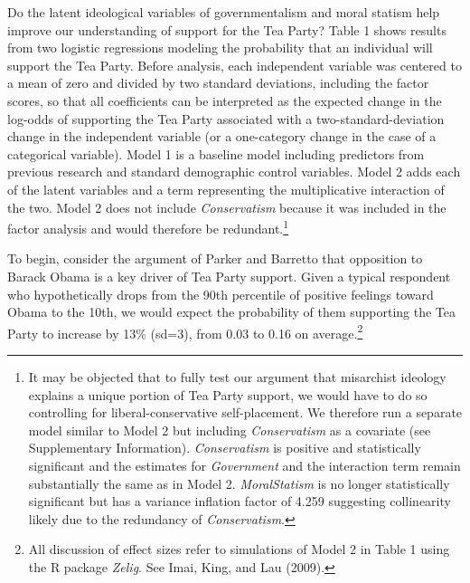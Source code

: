 \documentclass[12pt,]{article}
\begin{document}
Do the latent ideological variables of governmentalism and moral statism
help improve our understanding of support for the Tea Party? Table 1
shows results from two logistic regressions modeling the probability
that an individual will support the Tea Party. Before analysis, each
independent variable was centered to a mean of zero and divided by two
standard deviations, including the factor scores, so that all
coefficients can be interpreted as the expected change in the log-odds
of supporting the Tea Party associated with a two-standard-deviation
change in the independent variable (or a one-category change in the case
of a categorical variable). Model 1 is a baseline model including
predictors from previous research and standard demographic control
variables. Model 2 adds each of the latent variables and a term
representing the multiplicative interaction of the two. Model 2 does not
include \emph{Conservatism} because it was included in the factor
analysis and would therefore be redundant.\footnote{It may be objected
  that to fully test our argument that misarchist ideology explains a
  unique portion of Tea Party support, we would have to do so
  controlling for liberal-conservative self-placement. We therefore run
  a separate model similar to Model 2 but including \emph{Conservatism}
  as a covariate (see Supplementary Information). \emph{Conservatism} is
  positive and statistically significant and the estimates for
  \emph{Government} and the interaction term remain substantially the
  same as in Model 2. \emph{MoralStatism} is no longer statistically
  significant but has a variance inflation factor of 4.259 suggesting
  collinearity likely due to the redundancy of \emph{Conservatism}.}

To begin, consider the argument of Parker and Barretto that opposition
to Barack Obama is a key driver of Tea Party support. Given a typical
respondent who hypothetically drops from the 90th percentile of positive
feelings toward Obama to the 10th, we would expect the probability of
them supporting the Tea Party to increase by 13\% (sd=3), from 0.03 to
0.16 on average.\footnote{All discussion of effect sizes refer to
  simulations of Model 2 in Table 1 using the R package \emph{Zelig}.
  See Imai, King, and Lau (2009).}
\end{document}
